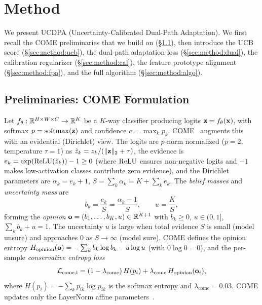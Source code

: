 \section{Method}
\label{sec:method}

We present UCDPA (Uncertainty-Calibrated Dual-Path Adaptation). We first recall the COME preliminaries that we build on (\S\ref{sec:method:prelim}), then introduce the UCB score (\S\ref{sec:method:ucb}), the dual-path adaptation loss (\S\ref{sec:method:dual}), the calibration regularizer (\S\ref{sec:method:cal}), the feature prototype alignment (\S\ref{sec:method:fpa}), and the full algorithm (\S\ref{sec:method:algo}).

\subsection{Preliminaries: COME Formulation}
\label{sec:method:prelim}

Let $f_\theta: \mathbb{R}^{H\times W\times C} \to \mathbb{R}^K$ be a $K$-way classifier producing logits $\mathbf{z} = f_\theta(\mathbf{x})$, with softmax $p = \operatorname{softmax}(\mathbf{z})$ and confidence $c = \max_k p_k$. COME~\citep{come2024come} augments this with an evidential (Dirichlet) view. The logits are $p$-norm normalized ($p{=}2$, temperature $\tau{=}1$) as $\tilde{z}_k = z_k / (\|\mathbf{z}\|_2 + \tau)$, the evidence is $e_k = \exp(\operatorname{ReLU}(\tilde{z}_k)) - 1 \ge 0$ (where $\operatorname{ReLU}$ ensures non-negative logits and $-1$ makes low-activation classes contribute zero evidence), and the Dirichlet parameters are $\alpha_k = e_k + 1$, $S = \sum_k \alpha_k = K + \sum_k e_k$. The \emph{belief masses} and \emph{uncertainty mass} are
\[
  b_k = \frac{e_k}{S} = \frac{\alpha_k - 1}{S}, \qquad u = \frac{K}{S},
\]
forming the \emph{opinion} $\mathbf{o} = (b_1,\dots,b_K,u) \in \mathbb{R}^{K+1}$ with $b_k \ge 0$, $u \in (0,1]$, $\sum_k b_k + u = 1$. The uncertainty $u$ is large when total evidence $S$ is small (model unsure) and approaches $0$ as $S \to \infty$ (model sure). COME defines the opinion entropy $H_\mathrm{opinion}(\mathbf{o}) = -\sum_k b_k \log b_k - u \log u$ (with $0\log 0 = 0$), and the per-sample \emph{conservative entropy loss}
\begin{equation}
  \mathcal{L}_\mathrm{come,i} = (1-\lambda_\mathrm{come})\, H(p_i) + \lambda_\mathrm{come}\, H_\mathrm{opinion}(\mathbf{o}_i),
  \label{eq:come-loss}
\end{equation}
where $H(p_i) = -\sum_k p_{ik}\log p_{ik}$ is the softmax entropy and $\lambda_\mathrm{come} = 0.03$. COME updates only the LayerNorm affine parameters~\citep{niu2023sar}.

